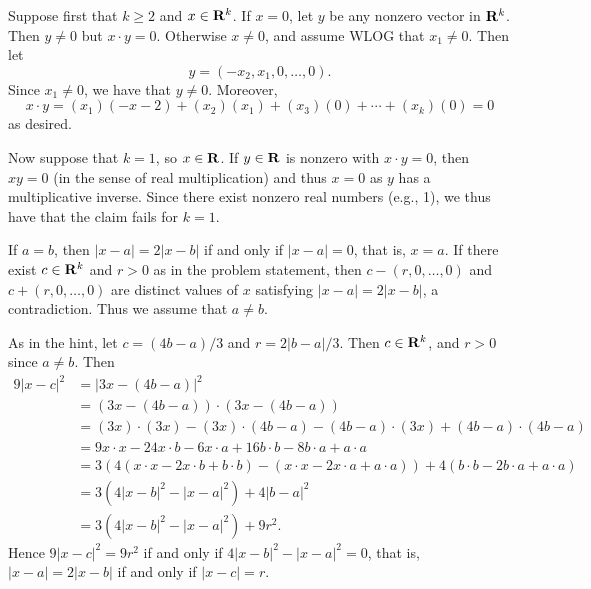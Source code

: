 \begin{ex}
Suppose first that $k \geq 2$ and $x \in \mathbf{R}^k$. If $x = 0$, let $y$ be any nonzero vector in $\mathbf{R}^k$. Then $y \not = 0$ but $x\cdot y = 0$. Otherwise $x \not = 0$, and assume WLOG that $x_1 \not = 0$. Then let \[y = (-x_2, x_1, 0, \ldots, 0).\] Since $x_1 \not = 0$, we have that $y \not = 0$. Moreover, \[x\cdot y = (x_1)(-x-2) + (x_2)(x_1) + (x_3)(0) + \cdots + (x_k)(0) = 0\] as desired.

Now suppose that $k = 1$, so $x \in \mathbf{R}$. If $y \in \mathbf{R}$ is nonzero with $x\cdot y = 0$, then $xy = 0$ (in the sense of real multiplication) and thus $x = 0$ as $y$ has a multiplicative inverse. Since there exist nonzero real numbers (e.g., 1), we thus have that the claim fails for $k = 1$.
\end{ex}

\begin{ex}
If $a = b$, then $|x - a| = 2|x - b|$ if and only if $|x - a| = 0$, that is, $x = a$. If there exist $c \in \mathbf{R}^k$ and $r > 0$ as in the problem statement, then $c - (r, 0, \ldots, 0)$ and $c + (r, 0, \ldots, 0)$ are distinct values of $x$ satisfying $|x - a| = 2|x - b|$, a contradiction. Thus we assume that $a \not = b$.

As in the hint, let $c = (4b-a)/3$ and $r = 2|b-a|/3$. Then $c \in \mathbf{R}^k$, and $r > 0$ since $a \not = b$. Then
\begin{align*}
9|x - c|^2 & = \left|3x - (4b-a)\right|^2\\
& = (3x - (4b-a))\cdot(3x - (4b-a))\\
& = (3x)\cdot(3x) - (3x)\cdot(4b-a) - (4b-a)\cdot(3x) + (4b-a)\cdot(4b-a)\\
& = 9x\cdot x - 24x\cdot b - 6x\cdot a + 16b\cdot b - 8b\cdot a + a\cdot a\\
& = 3(4(x\cdot x - 2x\cdot b + b\cdot b) - (x\cdot x - 2x\cdot a + a\cdot a)) + 4(b\cdot b - 2b\cdot a + a\cdot a)\\
& = 3(4|x-b|^2 - |x-a|^2) + 4|b-a|^2\\
& = 3(4|x-b|^2 - |x-a|^2) + 9r^2.
\end{align*}
Hence $9|x-c|^2 = 9r^2$ if and only if $4|x-b|^2 - |x-a|^2 = 0$, that is, $|x-a| = 2|x-b|$ if and only if $|x-c| = r$.
\end{ex}

\begin{ex}
[TODO]
\end{ex}